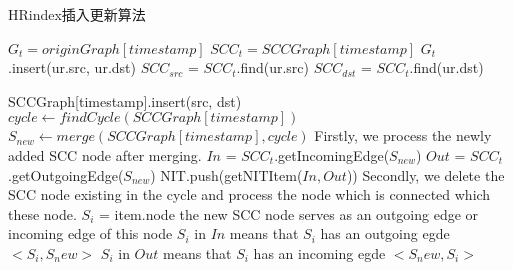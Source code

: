 \documentclass{article}
\begin{document}
\begin{algorithm*}
\caption{HRindex插入更新算法}

\begin{algorithmic}[1]
    \State $G_{t} = originGraph[timestamp]$
    \State $SCC_{t} = SCCGraph[timestamp]$
        \State {}
    \EndIf
        \State {}
    \EndIf
    \State $G_t$.insert(ur.src, ur.dst)
    \State $SCC_{src}$ = $SCC_t$.find(ur.src)
    \State $SCC_{dst}$ = $SCC_t$.find(ur.dst)

        \State \Return
    \Else
        \State SCCGraph[timestamp].insert(src, dst)
        \State $cycle \gets findCycle(SCCGraph[timestamp])$
            \State $S_{new} \gets merge(SCCGraph[timestamp], cycle)$
            \State \Comment Firstly, we process the newly added SCC node after merging.
            \State $In$ = $SCC_t$.getIncomingEdge($S_{new}$)
            \State $Out$ = $SCC_t$.getOutgoingEdge($S_{new}$)
            \Else 
                \State NIT.push(getNITItem($In, Out$)) 
            \EndIf
            \State \Comment Secondly, we delete the SCC node existing in the cycle and process the node which is connected which these node.
                \State $S_i$ = item.node
                    \State \Comment the new SCC node serves as an outgoing edge or incoming edge  of this node
                    \State \Comment $S_i$ in $In$ means that $S_i$ has an outgoing egde $<S_i, S_new>$
                    \EndIf
                    \State \Comment $S_i$ in $Out$ means that $S_i$ has an incoming egde $<S_new, S_i>$
                    \EndIf
                \Else 
                \EndIf  
            \EndFor
        \EndWhile

    \EndIf
\EndFunction


\end{algorithmic}
\end{algorithm*}
\end{document}
